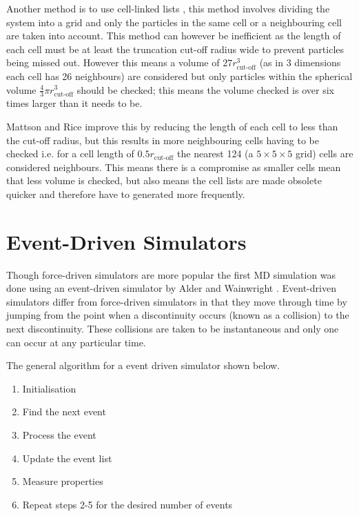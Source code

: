\documentclass[12pt]{UoAthesis}
\begin{document}
Another method is to use cell-linked lists \cite{Poschel2005}, this
method involves dividing the system into a grid and only the particles
in the same cell or a neighbouring cell are taken into account.  This
method can however be inefficient as the length of each cell must be
at least the truncation cut-off radius wide to prevent particles being
missed out.  However this means a volume of $27r_{\text{cut-off}}^3$
(as in 3 dimensions each cell has 26 neighbours) are considered but
only particles within the spherical volume $\frac{4}{3}\pi
r_{\text{cut-off}}^3$ should be checked; this means the volume checked
is over six times larger than it needs to be.  

Mattson and Rice \cite{Mattson1999} improve this by reducing the
length of each cell to less than the cut-off radius, but this results
in more neighbouring cells having to be checked i.e. for a cell length
of $0.5r_{\text{cut-off}}$ the nearest 124 (a $5\times 5\times 5$
grid) cells are considered neighbours. This means there is a
compromise as smaller cells mean that less volume is checked, but also
means the cell lists are made obsolete quicker and therefore have to
generated more frequently.

\section{Event-Driven Simulators}

Though force-driven simulators are more popular the first MD
simulation was done using an event-driven simulator by Alder and
Wainwright \cite{Alder1957}. Event-driven simulators differ from
force-driven simulators in that they move through time by jumping from
the point when a discontinuity occurs (known as a collision) to the
next discontinuity.  These collisions are taken to be instantaneous
and only one can occur at any particular time.

The general algorithm for a event driven simulator shown below.

\begin{flushleft}
  \begin{enumerate} 
  \item Initialisation 
  \item Find the next event
  \item Process the event
  \item Update the event list
  \item Measure properties 
  \item Repeat steps 2-5 for the desired number of events
  \end{enumerate} 
\end{flushleft}
\end{document}
